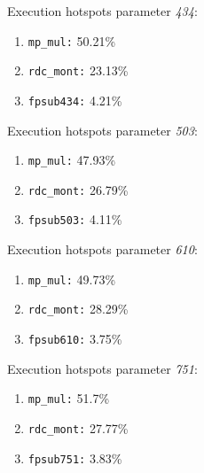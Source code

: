 Execution hotspots parameter \textit{434}:
\begin{enumerate}[noitemsep]
	\item \texttt{mp\_mul:} 50.21\%
	\item \texttt{rdc\_mont:} 23.13\%
	\item \texttt{fpsub434:} 4.21\%
\end{enumerate}
Execution hotspots parameter \textit{503}:
\begin{enumerate}[noitemsep]
	\item \texttt{mp\_mul:} 47.93\%
	\item \texttt{rdc\_mont:} 26.79\%
	\item \texttt{fpsub503:} 4.11\%
\end{enumerate}
Execution hotspots parameter \textit{610}:
\begin{enumerate}[noitemsep]
	\item \texttt{mp\_mul:} 49.73\%
	\item \texttt{rdc\_mont:} 28.29\%
	\item \texttt{fpsub610:} 3.75\%
\end{enumerate}
Execution hotspots parameter \textit{751}:
\begin{enumerate}[noitemsep]
	\item \texttt{mp\_mul:} 51.7\%
	\item \texttt{rdc\_mont:} 27.77\%
	\item \texttt{fpsub751:} 3.83\%
\end{enumerate}
